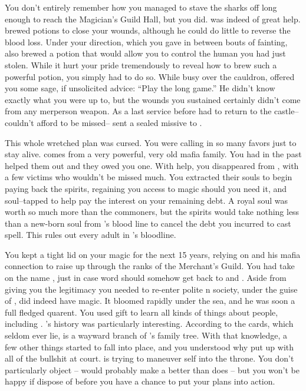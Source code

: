 \documentclass[char]{NeptuneBall}
\begin{document}
You don't entirely remember how you managed to stave the sharks off long enough to reach the Magician's Guild Hall, but you did. \cManta{} was indeed of great help. \cManta{\They} brewed potions to close your wounds, although he could do little to reverse the blood loss. Under your direction, which you gave in between bouts of fainting, \cManta{} also brewed a potion that would allow you to control the human \cSlave{\prince} you had just stolen. While it hurt your pride tremendously to reveal how to brew such a powerful potion, you simply had to do so. While busy over the cauldron, \cManta{} offered you some sage, if unsolicited advice: ``Play the long game.'' He didn't know exactly what you were up to, but the wounds you sustained certainly didn't come from any merperson weapon.  As a last service before \cManta{} had to return to the castle-- \cManta{\they} couldn't afford to be missed-- \cManta{} sent a sealed missive to \cPriest{}.

This whole wretched plan was cursed. You were calling in so many favors just to stay alive. \cPriest{} comes from a very powerful, very old mafia family. You had in the past helped them out and they owed you one.  With \cPriest{\their} help, you disappeared from \pAtlantis{}, with a few victims who wouldn't be missed much. You extracted their souls to begin paying back the spirits, regaining you access to magic should you need it, and soul--tapped \cSlave{} to help pay the interest on your remaining debt. A royal soul was worth so much more than the commoners, but the spirits would take nothing less than a new-born soul from \cAriel{}'s blood line to cancel the debt you incurred to cast \cAriel{\them} spell. This rules out every adult in \cAriel{}'s bloodline.

You kept a tight lid on your magic for the next 15 years, relying on \cPriest{} and his mafia connection to raise \cSlave{} up through the ranks of the Merchant's Guild. You had \cSlave{} take on the name \cSlave{\MYname}, just in case word should somehow get back to \cAriel{} and \cEric{}. Aside from giving you the legitimacy you needed to re-enter polite \pAtlantis{}n society, under the guise of \cWitch{\MYname}, \cSlave{} did indeed have magic. It bloomed rapidly under the sea, and he was soon a full fledged quarent. You used \cSlave{\them} gift to learn all kinds of things about people, including \cManta{}. \cManta{}'s history was particularly interesting. According to the cards, which seldom ever lie, \cManta{} is a wayward branch of \cKing{}'s family tree. With that knowledge, a few other things started to fall into place, and you understood why \cManta{} put up with all of the bullshit at court. \cManta{\They} is trying to maneuver \cManta{\them}self into the throne. You don't particularly object -- \cManta{\they} would probably make a better \cManta{\King} than \cKing{} does -- but you won't be happy if \cManta{\they} dispose of \cKing{} before you have a chance to put your plans into action.
\end{document}
